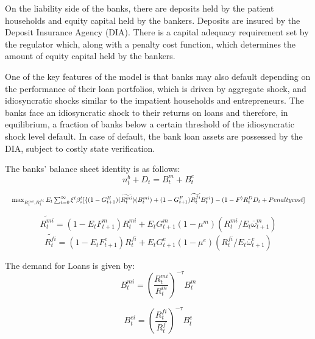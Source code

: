 \documentclass[12pt]{article}
\numberwithin{equation}{section}
\begin{document}
On the liability side of the banks, there are deposits held by the patient households and equity capital held by the bankers. Deposits are insured by the Deposit Insurance Agency (DIA). There is a capital adequacy requirement set by the regulator which, along with a penalty cost function, which determines the amount of equity capital held by the bankers.

One of the key features of the model  is that banks may also default depending on the performance of their loan portfolios, which is driven by aggregate shock, and idiosyncratic shocks similar to the impatient households and entrepreneurs.
 The banks face an idiosyncratic shock to their returns on loans and therefore, in equilibrium, a fraction of banks below a certain threshold of the idiosyncratic shock level default. In case of default, the bank loan assets are possessed by the DIA, subject to costly state verification. 

The banks' balance sheet identity is as follows:
\begin{equation}
n^b_{t}+D_{t}=B^m_{t}+B^e_{t}
\end{equation}




\begin{equation}
\resizebox{1\textwidth}{!}{$
	\max_{R^{mi}_t,R^{fi}_t}E_t\sum _{t=0}^{\infty }\xi^t\beta_{s}^t [\{(1-G^H_{t+1}) (\widetilde{R^{mi}_{t}})(B^{mi}_{t})+(1-G^F_{t+1})\widetilde{R^{fi}_{t}}B^{ei}_{t}\}-(1-F^){R^D_{t}}D_{t}+Penalty cost]$}
\end{equation}



\begin{equation}
\widetilde{R^{mi}_{t}}=(1-E_tF^m_{t+1})R^{mi}_t+E_tG^m_{t+1}(1 - \mu^m)( R^{mi}_t/E_t\bar{\omega}^m_{t+1})
\end{equation}
\begin{equation}
\widetilde{R^{fi}_{t}}=(1-E_tF^e_{t+1})R^{fi}_t+E_tG^e_{t+1}(1 - \mu^e)( R^{fi}_t/E_t\bar{\omega}^e_{t+1})
\end{equation}

The demand for Loans is given by:
\begin{equation}
B^{mi}_t=(\frac{R^{mi}_t}{R^{m}_t})^{-\tau} B^{m}_t
\end{equation}

\begin{equation}
B^{ei}_t=(\frac{R^{fi}_t}{R^{f}_t})^{-\tau} B^{e}_t
\end{equation}
\end{document}
